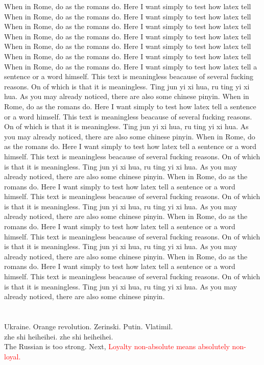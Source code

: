 \documentclass{ctexart}
\begin{document}
\begin{multicols}{2}
	When in Rome, do as the romans do. Here I want simply to test how latex tell
	When in Rome, do as the romans do. Here I want simply to test how latex tell
	When in Rome, do as the romans do. Here I want simply to test how latex tell
	When in Rome, do as the romans do. Here I want simply to test how latex tell
	When in Rome, do as the romans do. Here I want simply to test how latex tell
	When in Rome, do as the romans do. Here I want simply to test how latex tell
	When in Rome, do as the romans do. Here I want simply to test how latex tell a sentence or a word himself. This text is meaningless beacause of several fucking reasons. On of which is that it is meaningless. Ting jun yi xi hua, ru ting yi xi hua. As you may already noticed, there are also some chinese pinyin.
	When in Rome, do as the romans do. Here I want simply to test how latex tell a sentence or a word himself. This text is meaningless beacause of several fucking reasons. On of which is that it is meaningless. Ting jun yi xi hua, ru ting yi xi hua. As you may already noticed, there are also some chinese pinyin.
	When in Rome, do as the romans do. Here I want simply to test how latex tell a sentence or a word himself. This text is meaningless beacause of several fucking reasons. On of which is that it is meaningless. Ting jun yi xi hua, ru ting yi xi hua. As you may already noticed, there are also some chinese pinyin.
	When in Rome, do as the romans do. Here I want simply to test how latex tell a sentence or a word himself. This text is meaningless beacause of several fucking reasons. On of which is that it is meaningless. Ting jun yi xi hua, ru ting yi xi hua. As you may already noticed, there are also some chinese pinyin.
	When in Rome, do as the romans do. Here I want simply to test how latex tell a sentence or a word himself. This text is meaningless beacause of several fucking reasons. On of which is that it is meaningless. Ting jun yi xi hua, ru ting yi xi hua. As you may already noticed, there are also some chinese pinyin.
	When in Rome, do as the romans do. Here I want simply to test how latex tell a sentence or a word himself. This text is meaningless beacause of several fucking reasons. On of which is that it is meaningless. Ting jun yi xi hua, ru ting yi xi hua. As you may already noticed, there are also some chinese pinyin.
\end{multicols}
\section{\color{green}{COLOR}}
{\color{orange}Ukraine. Orange revolution. Zerinski. Putin. Vlatimil.}\\
{\color[rgb]{0.5,0.5,1}zhe shi heiheihei.}
{\color[gray]{0.5}zhe shi heiheihei.}\\
The Russian is too strong. Next, 
\textcolor{red}{Loyalty non-absolute means absolutely non-loyal.}\\
\end{document}
